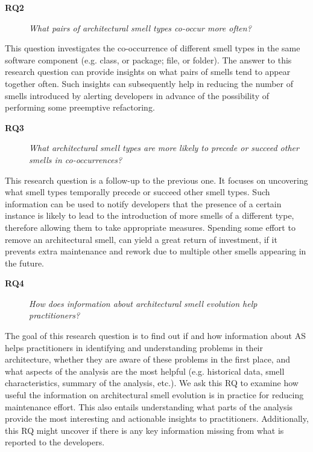 \begin{description} 
    \item[\textbf{RQ2}] \textit{What pairs of architectural smell types co-occur more often?}
\end{description}
This question investigates the co-occurrence of different smell types in the same software component (e.g. class, or package; file, or folder). The answer to this research question can provide insights on what pairs of smells tend to appear together often. Such insights can subsequently help in reducing the number of smells introduced by alerting developers in advance of the possibility of performing some preemptive refactoring.

\begin{description}
    \item[\textbf{RQ3}] \textit{What architectural smell types are more likely to precede or succeed other smells in co-occurrences?}
\end{description}
This research question is a follow-up to the previous one. It focuses on uncovering what smell types temporally precede or succeed other smell types.
Such information can be used to notify developers that the presence of a certain instance is likely to lead to the introduction of more smells of a different type, therefore allowing them to take appropriate measures. Spending some effort to remove an architectural smell, can yield a great return of investment, if it prevents extra maintenance and rework due to multiple other smells appearing in the future.


\begin{description}
    \item[\textbf{RQ4}] \textit{How does information about architectural smell evolution help practitioners?} %
\end{description}
The goal of this research question is to find out if and how information about AS helps practitioners in identifying and understanding problems in their architecture, whether they are aware of these problems in the first place, and what aspects of the analysis are the most helpful (e.g. historical data, smell characteristics, summary of the analysis, etc.).
We ask this RQ to examine how useful the information on architectural smell evolution is in practice for reducing maintenance effort. 
This also entails understanding what parts of the analysis provide the most interesting and actionable insights to practitioners.
Additionally, this RQ might uncover if there is any key information missing from what is reported to the developers.

